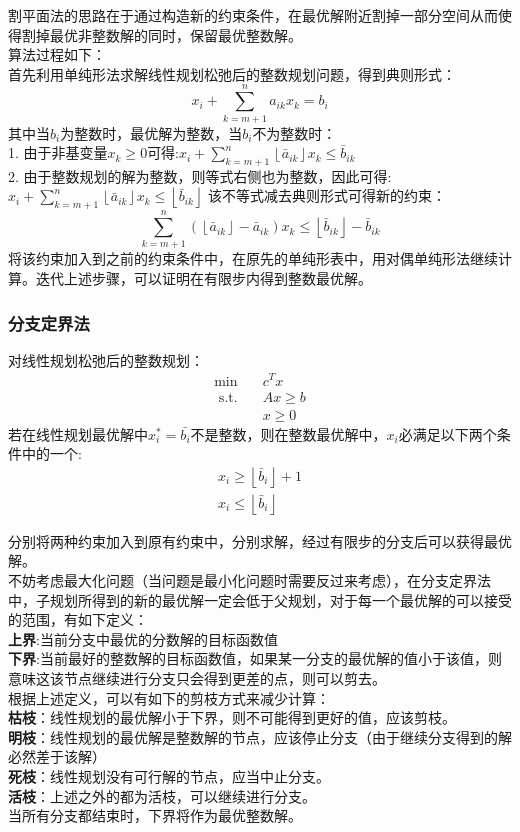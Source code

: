 \documentclass[11pt]{ctexart}
\begin{document}
割平面法的思路在于通过构造新的约束条件，在最优解附近割掉一部分空间从而使得割掉最优非整数解的同时，保留最优整数解。\\

算法过程如下：\\

首先利用单纯形法求解线性规划松弛后的整数规划问题，得到典则形式：
$$
x_{i}+\sum_{k=m+1}^{n} a_{i k} x_{k}=b_{i}
$$
其中当$b_{i}$为整数时，最优解为整数，当$b_{i}$不为整数时：\\
1. 由于非基变量$x_{k} \geq 0$可得:$x_{i}+\sum_{k=m+1}^{n}\left\lfloor\bar{a}_{i k}\right\rfloor x_{k} \leq \bar{b}_{i k}$  \\
2. 由于整数规划的解为整数，则等式右侧也为整数，因此可得:$
x_{i}+\sum_{k=m+1}^{n}\left\lfloor\bar{a}_{i k}\right\rfloor x_{k} \leq\left\lfloor\bar{b}_{i k}\right\rfloor$
该不等式减去典则形式可得新的约束：
$$
\sum_{k=m+1}^{n}\left(\left\lfloor\bar{a}_{i k}\right\rfloor-\bar{a}_{i k}\right) x_{k} \leq\left\lfloor\bar{b}_{i k}\right\rfloor-\bar{b}_{i k}
$$
将该约束加入到之前的约束条件中，在原先的单纯形表中，用对偶单纯形法继续计算。迭代上述步骤，可以证明在有限步内得到整数最优解。


\subsubsection{分支定界法}

对线性规划松弛后的整数规划：
$$
\begin{aligned}
\min  \quad & c^{T} x \\
\text { s.t. } & A x \geq b \\
& x \geq 0
\end{aligned}
$$
若在线性规划最优解中$x^*_i=\bar{b_i}$不是整数，则在整数最优解中，$x_i$必满足以下两个条件中的一个:
$$
\begin{array}{c}
x_{i} \geq\left\lfloor\bar{b}_{i}\right\rfloor+1 \\
x_{i} \leq\left\lfloor\bar{b}_{i}\right\rfloor
\end{array}
$$

分别将两种约束加入到原有约束中，分别求解，经过有限步的分支后可以获得最优解。\\

不妨考虑最大化问题（当问题是最小化问题时需要反过来考虑），在分支定界法中，子规划所得到的新的最优解一定会低于父规划，对于每一个最优解的可以接受的范围，有如下定义：\\
\textbf{上界}:当前分支中最优的分数解的目标函数值\\
\textbf{下界}:当前最好的整数解的目标函数值，如果某一分支的最优解的值小于该值，则意味这该节点继续进行分支只会得到更差的点，则可以剪去。\\

根据上述定义，可以有如下的剪枝方式来减少计算：\\

\textbf{枯枝}：线性规划的最优解小于下界，则不可能得到更好的值，应该剪枝。\\
\textbf{明枝}：线性规划的最优解是整数解的节点，应该停止分支（由于继续分支得到的解必然差于该解）\\
\textbf{死枝}：线性规划没有可行解的节点，应当中止分支。\\
\textbf{活枝}：上述之外的都为活枝，可以继续进行分支。\\

当所有分支都结束时，下界将作为最优整数解。
\end{document}
